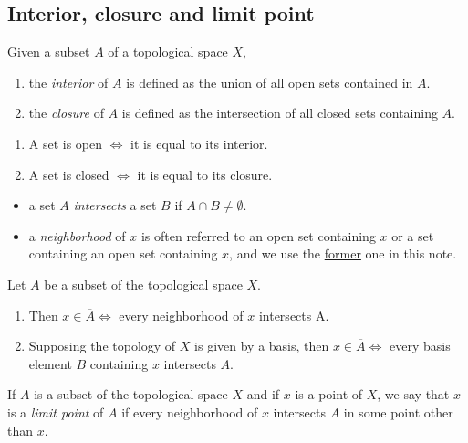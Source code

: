\subsection{Interior, closure and limit point}

\begin{definition}
  Given a subset \( A \) of a topological space \( X \),
  \begin{enumerate}
    \item the \emph{interior} of \( A \) is defined as the union of all open
      sets contained in \( A \).
    \item the \emph{closure} of \( A \) is defined as the intersection of all
      closed sets containing \( A \).
  \end{enumerate}
\end{definition}

\begin{proposition}
  \begin{enumerate}
    \item A set is open \( \iff \) it is equal to its interior.
    \item A set is closed \( \iff \) it is equal to its closure.
  \end{enumerate}
\end{proposition}

\begin{itemize}
  \item a set \( A \) \emph{intersects} a set \( B \) if \( A \cap B \neq
    \emptyset \).
  \item a \emph{neighborhood} of \( x \) is often referred to an open set
    containing \( x \) or a set containing an open set containing \( x \), and
    we use the \underline{former} one in this note.
\end{itemize}

\begin{theorem}
  Let \( A \) be a subset of the topological space \( X \).
  \begin{enumerate}
    \item Then \( x \in \overline{A} \iff \) every neighborhood of \( x \)
      intersects A.
    \item Supposing the topology of \( X \) is given by a basis, then \( x \in
      \overline{A} \iff \) every basis element \( B \) containing \( x \)
      intersects \( A \).
  \end{enumerate}
\end{theorem}

\begin{definition}
  If \( A \) is a subset of the topological space \( X \) and if \( x \) is a
  point of \( X \), we say that \( x \) is a \emph{limit point} of \( A \) if
  every neighborhood of \( x \) intersects \( A \) in some point other than \( x
  \).
\end{definition}

